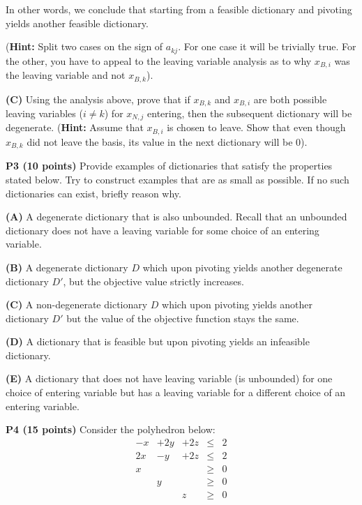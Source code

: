 \documentclass[11pt]{article}
\begin{document}
In other words, we conclude that starting from a feasible dictionary
and pivoting yields another feasible dictionary.

(\textbf{Hint:} Split two cases on the sign of $a_{kj}$. For one case
it will be trivially true. For the other, you have to appeal to the
leaving variable analysis as to why $x_{B,i}$ was the leaving variable and
not $x_{B,k}$).

\medskip


\noindent\textbf{(C)} Using the analysis above, prove that if $x_{B,k}$
and $x_{B,i}$ are both possible leaving variables ($i \not= k$) for $x_{N,j}$ entering,
then  the subsequent dictionary will be degenerate.  (\textbf{Hint:}
Assume that $x_{B,i}$ is chosen to leave. Show that even though $x_{B,k}$ did not leave the basis, its value in
the  next dictionary will be $0$).

\bigskip

\noindent\textbf{P3 (10 points)}  Provide examples of dictionaries
that satisfy the properties stated below. Try to construct
examples that are as small as possible. If no such
dictionaries can exist, briefly reason why.


\noindent\textbf{(A)} A degenerate dictionary that is also unbounded. 
Recall that an unbounded dictionary does not have a leaving variable for some
choice of an entering variable.

\medskip

\noindent\textbf{(B)} A degenerate dictionary $D$ which upon pivoting
yields another degenerate dictionary $D'$, but the objective value strictly
increases.

\medskip

\noindent\textbf{(C)} A non-degenerate dictionary $D$ which upon pivoting
yields another dictionary $D'$ but the value of the objective function
stays the same.

\medskip

\noindent\textbf{(D)} A dictionary that is feasible but upon pivoting
yields an infeasible dictionary.


\medskip

\noindent\textbf{(E)} A dictionary that does not have leaving variable
(is unbounded) for one choice of entering variable but has a leaving
variable for a different choice of an entering variable.

\bigskip

\noindent\textbf{P4 (15 points)}  Consider the polyhedron below:
\[ \begin{array}{ccccc}
 -x & + 2 y & + 2z & \leq & 2 \\
2 x & - y & + 2z & \leq & 2 \\
x & & & \geq & 0\\
& y& & \geq & 0 \\
& & z & \geq & 0 \\
\end{array}\]
\end{document}
